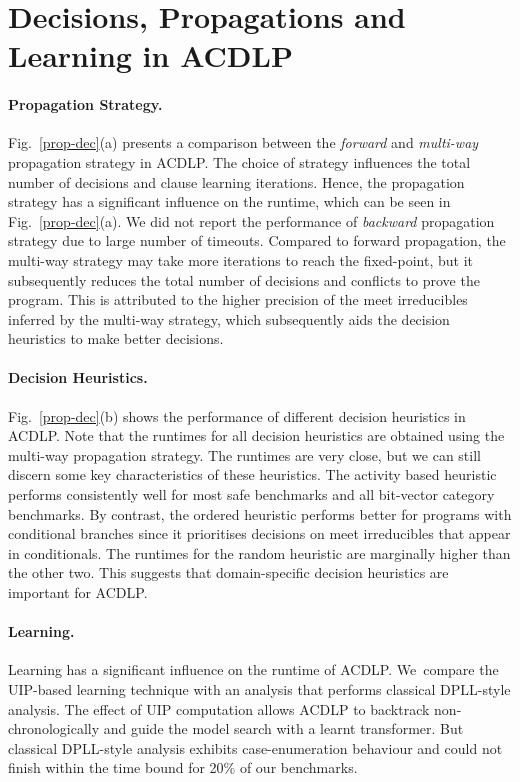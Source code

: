 \section{Decisions, Propagations and Learning in ACDLP}
%

%
\paragraph{Propagation Strategy.}
%
Fig.~\ref{prop-dec}(a) presents a comparison between the {\em forward} 
and {\em multi-way} propagation strategy in ACDLP.  The
choice of strategy influences the total number of decisions and clause 
learning iterations.  Hence, the propagation strategy has a
significant influence on the runtime, which can be seen in
Fig.~\ref{prop-dec}(a).  We did not report the performance 
of {\em backward} propagation strategy due to large 
number of timeouts.  Compared to forward propagation, the multi-way
strategy may take more iterations to reach the fixed-point, but it
subsequently reduces the total number of decisions and conflicts to prove the
program.  This is attributed to the higher precision of the meet irreducibles 
inferred by the multi-way strategy, which subsequently aids the decision 
heuristics to make better decisions.  

\paragraph{Decision Heuristics.}
%
Fig.~\ref{prop-dec}(b) shows the performance of different decision
heuristics in ACDLP.  Note that the runtimes for all decision heuristics are
obtained using the multi-way propagation strategy.  The runtimes are very
close, but we can still discern some key characteristics of these
heuristics.  The activity based heuristic performs consistently well for most safe
benchmarks and all bit-vector category benchmarks.  By contrast, the ordered
heuristic performs better for programs with conditional branches since it
prioritises decisions on meet irreducibles that appear in conditionals.  The
runtimes for the random heuristic are marginally higher than the other
two.  This suggests that domain-specific decision heuristics are important
for ACDLP.
%

\paragraph{Learning.}
%
Learning has a significant influence on the runtime of ACDLP.  We~compare
the UIP-based learning technique with an analysis that performs classical 
DPLL-style analysis.
The effect of UIP computation allows ACDLP to backtrack non-chronologically 
and guide the model search with a learnt transformer.  But classical 
DPLL-style analysis exhibits case-enumeration behaviour and could not finish 
within the time bound for 20\% of our benchmarks.
%

